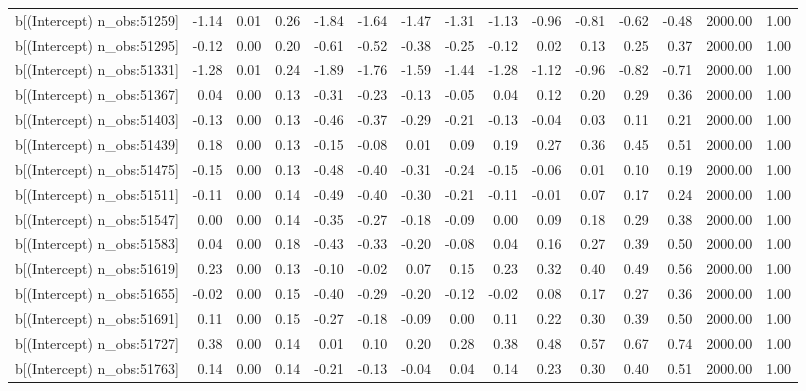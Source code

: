 \begin{table}[ht]
\begin{tabular}{rrrrrrrrrrrrrrr}
  b[(Intercept) n\_obs:51259] & -1.14 & 0.01 & 0.26 & -1.84 & -1.64 & -1.47 & -1.31 & -1.13 & -0.96 & -0.81 & -0.62 & -0.48 & 2000.00 & 1.00 \\ 
  b[(Intercept) n\_obs:51295] & -0.12 & 0.00 & 0.20 & -0.61 & -0.52 & -0.38 & -0.25 & -0.12 & 0.02 & 0.13 & 0.25 & 0.37 & 2000.00 & 1.00 \\ 
  b[(Intercept) n\_obs:51331] & -1.28 & 0.01 & 0.24 & -1.89 & -1.76 & -1.59 & -1.44 & -1.28 & -1.12 & -0.96 & -0.82 & -0.71 & 2000.00 & 1.00 \\ 
  b[(Intercept) n\_obs:51367] & 0.04 & 0.00 & 0.13 & -0.31 & -0.23 & -0.13 & -0.05 & 0.04 & 0.12 & 0.20 & 0.29 & 0.36 & 2000.00 & 1.00 \\ 
  b[(Intercept) n\_obs:51403] & -0.13 & 0.00 & 0.13 & -0.46 & -0.37 & -0.29 & -0.21 & -0.13 & -0.04 & 0.03 & 0.11 & 0.21 & 2000.00 & 1.00 \\ 
  b[(Intercept) n\_obs:51439] & 0.18 & 0.00 & 0.13 & -0.15 & -0.08 & 0.01 & 0.09 & 0.19 & 0.27 & 0.36 & 0.45 & 0.51 & 2000.00 & 1.00 \\ 
  b[(Intercept) n\_obs:51475] & -0.15 & 0.00 & 0.13 & -0.48 & -0.40 & -0.31 & -0.24 & -0.15 & -0.06 & 0.01 & 0.10 & 0.19 & 2000.00 & 1.00 \\ 
  b[(Intercept) n\_obs:51511] & -0.11 & 0.00 & 0.14 & -0.49 & -0.40 & -0.30 & -0.21 & -0.11 & -0.01 & 0.07 & 0.17 & 0.24 & 2000.00 & 1.00 \\ 
  b[(Intercept) n\_obs:51547] & 0.00 & 0.00 & 0.14 & -0.35 & -0.27 & -0.18 & -0.09 & 0.00 & 0.09 & 0.18 & 0.29 & 0.38 & 2000.00 & 1.00 \\ 
  b[(Intercept) n\_obs:51583] & 0.04 & 0.00 & 0.18 & -0.43 & -0.33 & -0.20 & -0.08 & 0.04 & 0.16 & 0.27 & 0.39 & 0.50 & 2000.00 & 1.00 \\ 
  b[(Intercept) n\_obs:51619] & 0.23 & 0.00 & 0.13 & -0.10 & -0.02 & 0.07 & 0.15 & 0.23 & 0.32 & 0.40 & 0.49 & 0.56 & 2000.00 & 1.00 \\ 
  b[(Intercept) n\_obs:51655] & -0.02 & 0.00 & 0.15 & -0.40 & -0.29 & -0.20 & -0.12 & -0.02 & 0.08 & 0.17 & 0.27 & 0.36 & 2000.00 & 1.00 \\ 
  b[(Intercept) n\_obs:51691] & 0.11 & 0.00 & 0.15 & -0.27 & -0.18 & -0.09 & 0.00 & 0.11 & 0.22 & 0.30 & 0.39 & 0.50 & 2000.00 & 1.00 \\ 
  b[(Intercept) n\_obs:51727] & 0.38 & 0.00 & 0.14 & 0.01 & 0.10 & 0.20 & 0.28 & 0.38 & 0.48 & 0.57 & 0.67 & 0.74 & 2000.00 & 1.00 \\ 
  b[(Intercept) n\_obs:51763] & 0.14 & 0.00 & 0.14 & -0.21 & -0.13 & -0.04 & 0.04 & 0.14 & 0.23 & 0.30 & 0.40 & 0.51 & 2000.00 & 1.00 \\ 

\end{tabular}
\end{table}
